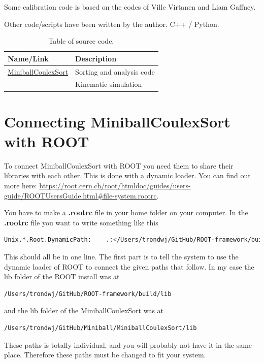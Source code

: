 \documentclass[twoside,english]{uiofysmaster/uiofysmaster}
\begin{document}
\begin{appendices}
Some calibration code is based on the codes of Ville Virtanen and Liam Gaffney. 

Other code/scripts have been written by the author. C++ / Python.

\begin{table}[h]
  \centering
  \caption{Table of source code.}
    \begin{tabular}{ll}
        \hline
        Name/Link & Description \\
        \hline
         \href{https://github.com/Miniball/MiniballCoulexSort}{MiniballCoulexSort} & Sorting and analysis code \\
         \href{https://github.com/lpgaff/kinsim} & Kinematic simulation \\
        \hline
    \end{tabular}
    \label{tab:code}
\end{table}


\chapter{Connecting MiniballCoulexSort with ROOT}
To connect MiniballCoulexSort with ROOT you need them to share their libraries with each other. This is done with a dynamic loader. You can find out more here: \url{https://root.cern.ch/root/htmldoc/guides/users-guide/ROOTUsersGuide.html#file-system.rootrc}. 

You have to make a \textbf{.rootrc} file in your home folder on your computer. In the \textbf{.rootrc} file you want to write something like this 
\begin{lstlisting}[language=sh]
Unix.*.Root.DynamicPath:    .:</Users/trondwj/GitHub/ROOT-framework/build/lib>:/Users/trondwj/GitHub/Miniball/MiniballCoulexSort/lib:
\end{lstlisting}
This should all be in one line. The first part is to tell the system to use the dynamic loader of ROOT to connect the given paths that follow. In my case the lib folder of the ROOT install was at 
\begin{lstlisting}[language=sh]
/Users/trondwj/GitHub/ROOT-framework/build/lib
\end{lstlisting}
and the lib folder of the MiniballCoulexSort was at
\begin{lstlisting}[language=sh]
/Users/trondwj/GitHub/Miniball/MiniballCoulexSort/lib
\end{lstlisting}
These paths is totally individual, and you will probably not have it in the same place. Therefore these paths must be changed to fit your system. 


\end{appendices}
\end{document}
